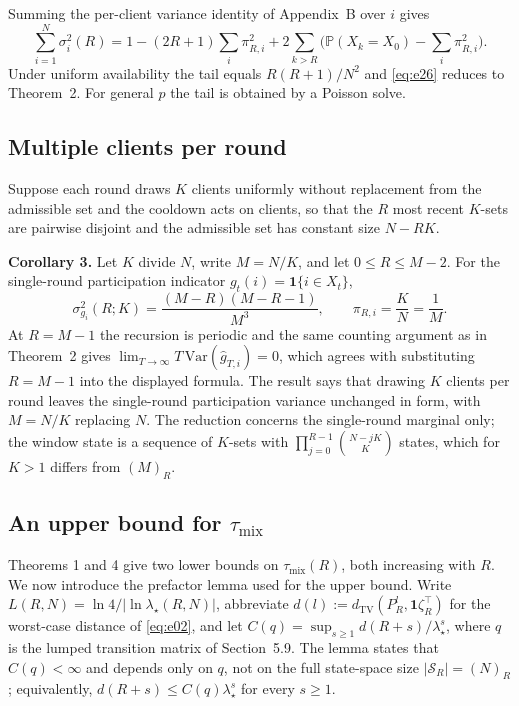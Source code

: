 \documentclass[twoside,11pt]{article}
\begin{document}
Summing the per-client variance identity of Appendix~B over $i$ gives
\begin{equation}\label{eq:e26}
\sum_{i=1}^{N}\sigma_i^{2}(R)=1-(2R+1)\sum_i\pi_{R,i}^{2} +2\sum_{k>R}\Big(\mathbb{P}(X_k=X_0)-\sum_i\pi_{R,i}^{2}\Big).
\end{equation}
Under uniform availability the tail equals $R(R+1)/N^{2}$ and \eqref{eq:e26}
reduces to Theorem~2. For general $p$ the tail is obtained by a Poisson
solve.

\subsection{Multiple clients per round}
Suppose each round draws $K$ clients uniformly without replacement from the admissible set and the cooldown acts on clients, so that the $R$ most recent $K$-sets are pairwise disjoint and the admissible set has constant size $N-RK$.

\textbf{Corollary 3.} Let $K$ divide $N$, write $M=N/K$, and let $0\leq R\leq M-2$. For the single-round participation indicator $g_t(i)=\mathbf{1}\{i\in X_t\}$,
\begin{equation}\label{eq:e27}
\sigma_{g_i}^{2}(R;K)=\dfrac{(M-R)(M-R-1)}{M^{3}},\qquad \pi_{R,i}=\dfrac{K}{N}=\dfrac{1}{M}.
\end{equation}
At $R=M-1$ the recursion is periodic and the same counting argument as in Theorem~2 gives $\lim_{T\to\infty}T\,\mathrm{Var}(\hat g_{T,i})=0$, which agrees with substituting $R=M-1$ into the displayed formula. The result says that drawing $K$ clients per round leaves the single-round participation variance unchanged in form, with $M=N/K$ replacing $N$. The reduction concerns the single-round marginal only; the window state is a sequence of $K$-sets with $\prod_{j=0}^{R-1}\binom{N-jK}{K}$ states, which for $K>1$ differs from $(M)_R$.

\subsection{\texorpdfstring{An upper bound for $\tau_{\mathrm{mix}}$}{An upper bound for tau mix}}
Theorems 1 and 4 give two lower bounds on $\tau_{\mathrm{mix}}(R)$, both increasing with $R$. We now introduce the prefactor
lemma used for the upper bound. Write $L(R,N)=\ln4/|\ln\lambda_\star(R,N)|$,
abbreviate $d(l):=d_{\mathrm{TV}}(P_R^{l},\mathbf{1}\zeta_R^{\top})$ for the
worst-case distance of \eqref{eq:e02}, and let
$C(q)=\sup_{s\geq1}d(R+s)/\lambda_\star^s$, where $q$ is the lumped
transition matrix of Section~5.9. The lemma states that $C(q)<\infty$ and
depends only on $q$, not on the full state-space size
$|\mathcal{S}_R|=(N)_R$; equivalently, $d(R+s)\le C(q)\lambda_\star^s$ for
every $s\geq1$.
\end{document}

